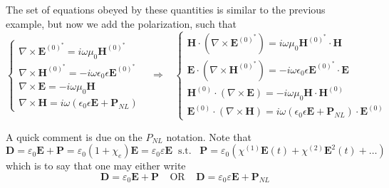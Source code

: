 The set of equations obeyed by these quantities is similar to the previous example, but now we add the polarization, such that
\begin{equation}
\begin{cases}
\nabla\times\textbf{E}^{(0)^*}=i\omega\mu_0\textbf{H}^{(0)^*}\\

\nabla\times\textbf{H}^{(0)^*}=-i\omega\epsilon_0\epsilon\textbf{E}^{(0)^*}\\

\nabla\times\textbf{E}=-i\omega\mu_0\textbf{H}\\

\nabla\times\textbf{H}=i\omega\left(\epsilon_0\epsilon\textbf{E}+\textbf{P}_{NL}\right)
\end{cases}\;\;\;\Rightarrow\;\;\;
%
\begin{cases}
\textbf{H}\cdot(\nabla\times\textbf{E}^{(0)^*})=i\omega\mu_0\textbf{H}^{(0)^*}\cdot\textbf{H}\\

\textbf{E}\cdot(\nabla\times\textbf{H}^{(0)^*})=-i\omega\epsilon_0\epsilon\textbf{E}^{(0)^*}\cdot\textbf{E}\\

\textbf{H}^{(0)}\cdot(\nabla\times\textbf{E})=-i\omega\mu_0\textbf{H}\cdot\textbf{H}^{(0)}\\

\textbf{E}^{(0)}\cdot(\nabla\times\textbf{H})=i\omega\left(\epsilon_0\epsilon\textbf{E}+\textbf{P}_{NL}\right)\cdot\textbf{E}^{(0)}
\end{cases}
\end{equation}

A quick comment is due on the $P_{NL}$ notation. Note that
\begin{equation}
    \textbf{D}=\varepsilon_0\textbf{E}+\textbf{P}=\varepsilon_0(1+\chi_e)\textbf{E}=\varepsilon_0\varepsilon\textbf{E}\;\;\text{s.t.}\;\;\;\textbf{P}=\varepsilon_0\left(\chi^{(1)}\textbf{E}(t)+\chi^{(2)}\textbf{E}^2(t)+\dots\right)
\end{equation}
which is to say that one may either write
\begin{equation}
    \textbf{D}=\varepsilon_0\textbf{E}+\textbf{P}\;\;\;\;\text{OR}\;\;\;\;\textbf{D}=\varepsilon_0\varepsilon\textbf{E}+\textbf{P}_{NL}
\end{equation}

